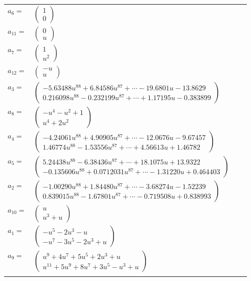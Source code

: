 \documentclass[1p]{elsarticle_modified}
\theoremstyle{definition}
\begin{document}
\begin{tabular}{m{7pt} m{180pt} m{7pt} m{180pt} }
\flushright $a_{6}=$&$\begin{pmatrix}1\\0\end{pmatrix}$ \\
\flushright $a_{11}=$&$\begin{pmatrix}0\\u\end{pmatrix}$ \\
\flushright $a_{7}=$&$\begin{pmatrix}1\\u^2\end{pmatrix}$ \\
\flushright $a_{12}=$&$\begin{pmatrix}- u\\u\end{pmatrix}$ \\
\flushright $a_{3}=$&$\begin{pmatrix}-5.63488 u^{88}+6.84586 u^{87}+\cdots-19.6801 u-13.8629\\0.216098 u^{88}-0.232199 u^{87}+\cdots+1.17195 u-0.383899\end{pmatrix}$ \\
\flushright $a_{8}=$&$\begin{pmatrix}- u^4- u^2+1\\u^4+2 u^2\end{pmatrix}$ \\
\flushright $a_{4}=$&$\begin{pmatrix}-4.24061 u^{88}+4.90905 u^{87}+\cdots-12.0676 u-9.67457\\1.46774 u^{88}-1.53556 u^{87}+\cdots+4.56613 u+1.46782\end{pmatrix}$ \\
\flushright $a_{5}=$&$\begin{pmatrix}5.24438 u^{88}-6.38436 u^{87}+\cdots+18.1075 u+13.9322\\-0.135606 u^{88}+0.0712031 u^{87}+\cdots-1.31220 u+0.464403\end{pmatrix}$ \\
\flushright $a_{2}=$&$\begin{pmatrix}-1.00290 u^{88}+1.84480 u^{87}+\cdots-3.68274 u-1.52239\\0.839015 u^{88}-1.67801 u^{87}+\cdots-0.719508 u+0.838993\end{pmatrix}$ \\
\flushright $a_{10}=$&$\begin{pmatrix}u\\u^3+u\end{pmatrix}$ \\
\flushright $a_{1}=$&$\begin{pmatrix}- u^5-2 u^3- u\\- u^7-3 u^5-2 u^3+u\end{pmatrix}$ \\
\flushright $a_{9}=$&$\begin{pmatrix}u^9+4 u^7+5 u^5+2 u^3+u\\u^{11}+5 u^9+8 u^7+3 u^5- u^3+u\end{pmatrix}$\\&\end{tabular}
\end{document}
